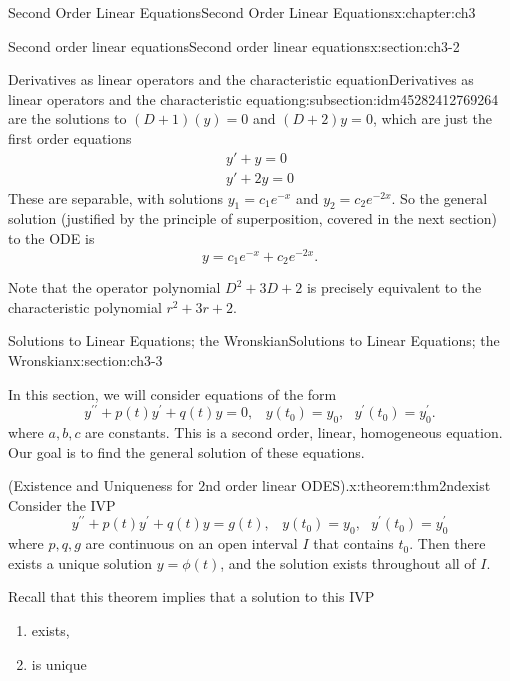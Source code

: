 \documentclass[oneside,10pt,]{book}
\numberwithin{equation}{section}
\numberwithin{equation}{section}
\begin{document}
\begin{chapterptx}{Second Order Linear Equations}{}{Second Order Linear Equations}{}{}{x:chapter:ch3}
\begin{sectionptx}{Second order linear equations}{}{Second order linear equations}{}{}{x:section:ch3-2}
\begin{subsectionptx}{Derivatives as linear operators and the characteristic equation}{}{Derivatives as linear operators and the characteristic equation}{}{}{g:subsection:idm45282412769264}
are the solutions to \((D + 1)(y) = 0\) and \((D + 2)y = 0\), which are just the first order equations%
\begin{gather*}
y' + y = 0\\
y' + 2y = 0
\end{gather*}
These are separable, with solutions \(y_1 = c_1 e^{-x}\) and \(y_2 = c_2 e^{-2x}\). So the general solution (justified by the principle of superposition, covered in the next section) to the ODE is%
\begin{equation*}
y = c_1 e^{-x} + c_2 e^{-2x}.
\end{equation*}
%
\par
Note that the operator polynomial \(D^2 + 3D + 2\) is precisely equivalent to the characteristic polynomial \(r^2 + 3r + 2\).%
\end{subsectionptx}
\end{sectionptx}
%
%
\typeout{************************************************}
\typeout{************************************************}
%
\begin{sectionptx}{Solutions to Linear Equations; the Wronskian}{}{Solutions to Linear Equations; the Wronskian}{}{}{x:section:ch3-3}
\begin{introduction}{}%
In this section, we will consider equations of the form%
\begin{equation*}
y^{\prime\prime}+p(t)y^{\prime}+q(t)y=0,\,\,\,\,\,y(t_{0})=y_{0},\,\,\,\,y^{\prime}(t_{0})=y_{0}^{\prime}.
\end{equation*}
where \(a,b,c\) are constants. This is a second order, linear, homogeneous equation. Our goal is to find the general solution of these equations.%
\begin{theorem}{(Existence and Uniqueness for \(2\)nd order linear ODES).}{}{x:theorem:thm2ndexist}%
Consider the IVP%
\begin{equation*}
y^{\prime\prime}+p(t)y^{\prime}+q(t)y=g(t),\,\,\,\,\,y(t_{0})=y_{0},\,\,\,\,y^{\prime}(t_{0})=y_{0}^{\prime}
\end{equation*}
where \(p,q,g\) are continuous on an open interval \(I\) that contains \(t_{0}\). Then there exists a unique solution \(y=\phi(t)\), and the solution exists throughout all of \(I\).%
\end{theorem}
Recall that this theorem implies that a solution to this IVP%
\begin{enumerate}
\item{}exists,%
\item{}is unique%

\end{enumerate}
\end{introduction}
\end{sectionptx}
\end{chapterptx}
\end{document}
